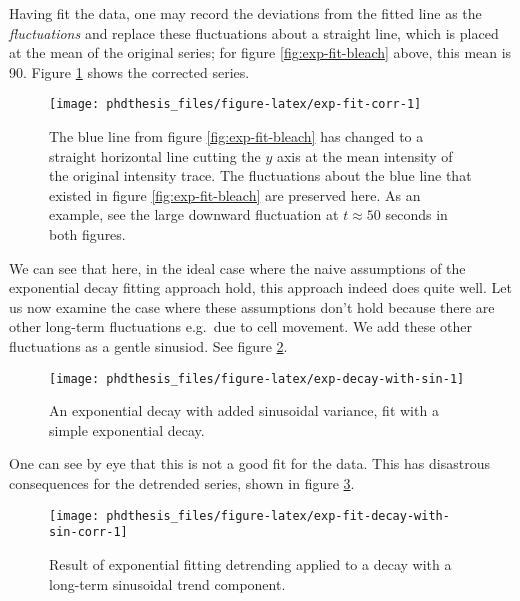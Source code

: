 \documentclass[12pt,]{book}
\theoremstyle{definition}
\theoremstyle{definition}
\theoremstyle{definition}
\theoremstyle{remark}
\begin{document}
Having fit the data, one may record the deviations from the fitted line
as the \emph{fluctuations} and replace these fluctuations about a
straight line, which is placed at the mean of the original series; for
figure \ref{fig:exp-fit-bleach} above, this mean is 90. Figure
\ref{fig:exp-fit-corr} shows the corrected series.








\begin{figure}

\texttt{[image: phdthesis\_files/figure-latex/exp-fit-corr-1]} \hfill{}

\caption{The blue line from figure
\ref{fig:exp-fit-bleach} has changed to a straight horizontal line
cutting the \(y\) axis at the mean intensity of the original intensity
trace. The fluctuations about the blue line that existed in figure
\ref{fig:exp-fit-bleach} are preserved here. As an example, see the
large downward fluctuation at \(t \approx 50\) seconds in both figures.}\label{fig:exp-fit-corr}
\end{figure}

We can see that here, in the ideal case where the naive assumptions of
the exponential decay fitting approach hold, this approach indeed does
quite well. Let us now examine the case where these assumptions don't
hold because there are other long-term fluctuations e.g.~due to cell
movement. We add these other fluctuations as a gentle sinusiod. See
figure \ref{fig:exp-decay-with-sin}.




\begin{figure}

\texttt{[image: phdthesis\_files/figure-latex/exp-decay-with-sin-1]} \hfill{}

\caption{An exponential decay with added
sinusoidal variance, fit with a simple exponential decay.}\label{fig:exp-decay-with-sin}
\end{figure}

One can see by eye that this is not a good fit for the data. This has
disastrous consequences for the detrended series, shown in figure
\ref{fig:exp-fit-decay-with-sin-corr}.





\begin{figure}

\texttt{[image: phdthesis\_files/figure-latex/exp-fit-decay-with-sin-corr-1]} \hfill{}

\caption{Result of exponential fitting
detrending applied to a decay with a long-term sinusoidal trend
component.}\label{fig:exp-fit-decay-with-sin-corr}
\end{figure}
\end{document}

